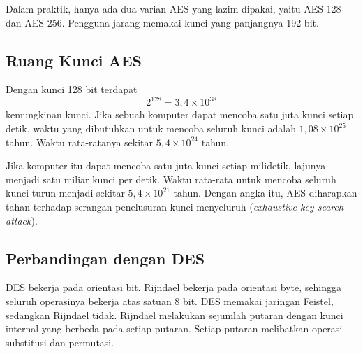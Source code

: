 Dalam praktik, hanya ada dua varian AES yang lazim dipakai, yaitu AES-128 dan
AES-256. Pengguna jarang memakai kunci yang panjangnya 192 bit.

\subsection{Ruang Kunci AES}

Dengan kunci 128 bit terdapat
\[
2^{128} = 3{,}4 \times 10^{38}
\]
kemungkinan kunci. Jika sebuah komputer dapat mencoba satu juta kunci setiap
detik, waktu yang dibutuhkan untuk mencoba seluruh kunci adalah
$1{,}08 \times 10^{25}$ tahun. Waktu rata-ratanya sekitar
$5{,}4 \times 10^{24}$ tahun.

Jika komputer itu dapat mencoba satu juta kunci setiap milidetik, lajunya menjadi
satu miliar kunci per detik. Waktu rata-rata untuk mencoba seluruh kunci turun
menjadi sekitar $5{,}4 \times 10^{21}$ tahun.
Dengan angka itu, AES diharapkan tahan terhadap serangan penelusuran kunci
menyeluruh (\textit{exhaustive key search attack}).

\subsection{Perbandingan dengan DES}

DES bekerja pada orientasi bit. Rijndael bekerja pada orientasi byte, sehingga
seluruh operasinya bekerja atas satuan 8 bit. DES memakai jaringan Feistel,
sedangkan Rijndael tidak. Rijndael melakukan sejumlah putaran dengan kunci internal
yang berbeda pada setiap putaran. Setiap putaran melibatkan operasi substitusi dan
permutasi.
